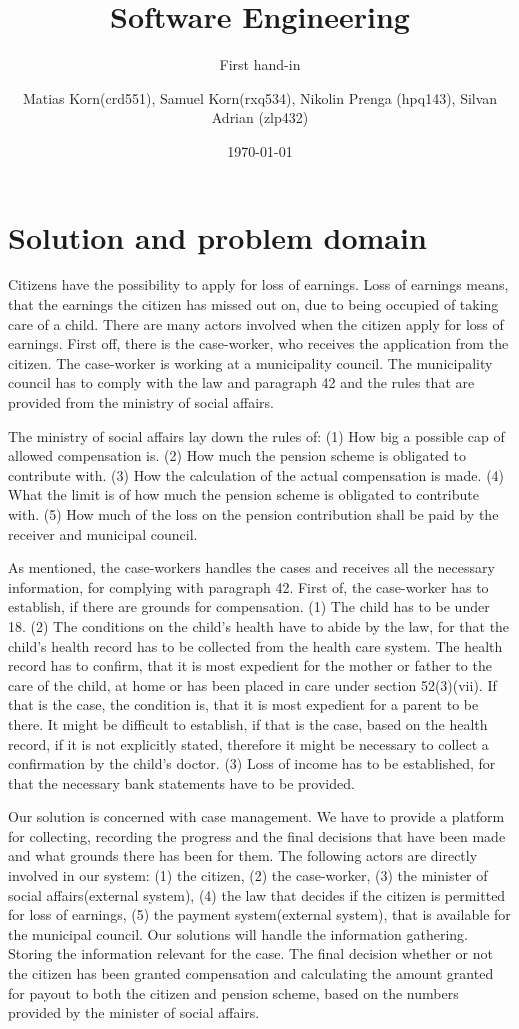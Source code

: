 \documentclass{article}
\title{Software Engineering}
\subtitle{First hand-in}
\author{Matias Korn(crd551), Samuel Korn(rxq534), Nikolin Prenga (hpq143), Silvan Adrian (zlp432)}
\date{\today}
\begin{document}
\maketitle

\section{Solution and problem domain}
Citizens have the possibility to apply for loss of earnings. Loss of earnings means, that the earnings the citizen has missed out on, due to being occupied of taking care of a child. There are many actors involved when the citizen apply for loss of earnings. First off, there is the case-worker, who receives the application from the citizen. The case-worker is working at a municipality council. The municipality council has to comply with the law and paragraph 42 and the rules that are provided from the ministry of social affairs.

The ministry of social affairs lay down the rules of:
(1) How big a possible cap of allowed compensation is.
(2) How much the pension scheme is obligated to contribute with. (3) How the calculation of the actual compensation is made. (4) What the limit is of how much the pension scheme is obligated to contribute with. (5) How much of the loss on the pension contribution shall be paid by the receiver and municipal council.

As mentioned, the case-workers handles the cases and receives all the necessary information, for complying with paragraph 42. First of, the case-worker has to establish, if there are grounds for compensation. (1) The child has to be under 18. (2) The conditions on the child's health have to abide by the law, for that the child's health record has to be collected from the health care system. The health record has to confirm, that it is most expedient for the mother or father to the care of the child, at home or has been placed in care under section 52(3)(vii). If that is the case, the condition is, that it is most expedient for a parent to be there. It might be difficult to establish, if that is the case, based on the health record, if it is not explicitly stated, therefore it might be necessary to collect a confirmation by the child's doctor. (3) Loss of income has to be established, for that the necessary bank statements have to be provided.

Our solution is concerned with case management. We have to provide a platform for collecting, recording the progress and the final decisions that have been made and what grounds there has been for them. The following actors are directly involved in our system: (1) the citizen, (2) the case-worker, (3) the minister of social affairs(external system), (4) the law that decides if the citizen is permitted for loss of earnings, (5) the payment system(external system), that is available for the municipal council. Our solutions will handle the information gathering. Storing the information relevant for the case. The final decision whether or not the citizen has been granted compensation and calculating the amount granted for payout to both the citizen and pension scheme, based on the numbers provided by the minister of social affairs.
\end{document}
